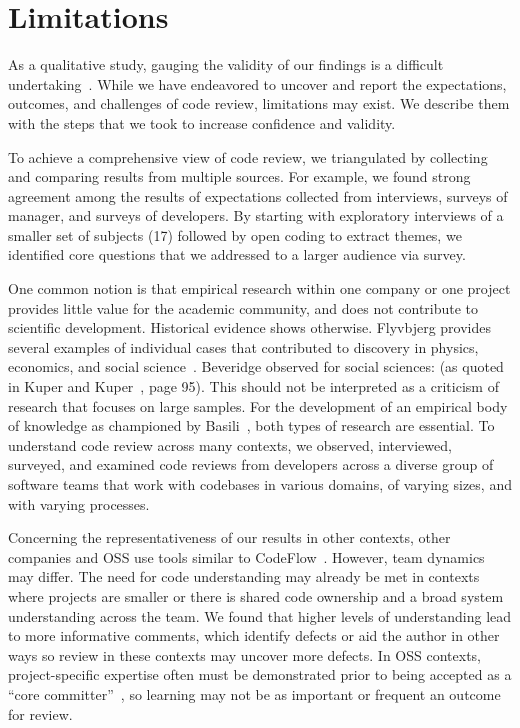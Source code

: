 
\section{Limitations} \label{sec:limitations}


As a qualitative study, gauging the validity of our findings is a difficult undertaking~\cite{golafshani2003understanding}. While we have endeavored to uncover and report the expectations, outcomes, and challenges of code review, limitations may exist. We describe them with the steps that we took to increase confidence and validity.

To achieve a comprehensive view of code review, we triangulated by collecting and comparing results from multiple sources. For example, we found strong agreement among the results of expectations collected from interviews, surveys of manager, and surveys of developers. By starting with exploratory interviews of a smaller set of subjects (17) followed by open coding to extract themes, we identified core questions that we addressed to a larger audience via survey.

One common notion is that empirical research within one company or one project provides little value for the academic community, and does not contribute to scientific development. Historical evidence shows otherwise. Flyvbjerg provides several examples of individual cases that contributed to discovery in physics, economics, and social science~\cite{flyvbjerg2006five}. Beveridge observed for social sciences:  (as quoted in Kuper and Kuper~\cite{kuper1995social}, page 95). This should not be interpreted as a criticism of research that focuses on large samples. For the development of an empirical body of knowledge as championed by Basili~\cite{basili1999building}, both types of research are essential. To understand code review across many contexts, we observed, interviewed, surveyed, and examined code reviews from developers across a diverse group of software teams that work with codebases in various domains, of varying sizes, and with varying processes.

Concerning the representativeness of our results in other contexts, other companies and OSS use tools similar to CodeFlow~\cite{gerrit2012online, tsotsis2011online, kennedy2006online}. However, team dynamics may differ. The need for code understanding may already be met in contexts where projects are smaller or there is shared code ownership and a broad system understanding across the team. We found that higher levels of understanding lead to more informative comments, which identify defects or aid the author in other ways so review in these contexts may uncover more defects. In OSS contexts, project-specific expertise often must be demonstrated prior to being accepted as a ``core committer''~\cite{bird2007open}, so learning may not be as important or frequent an outcome for review.

